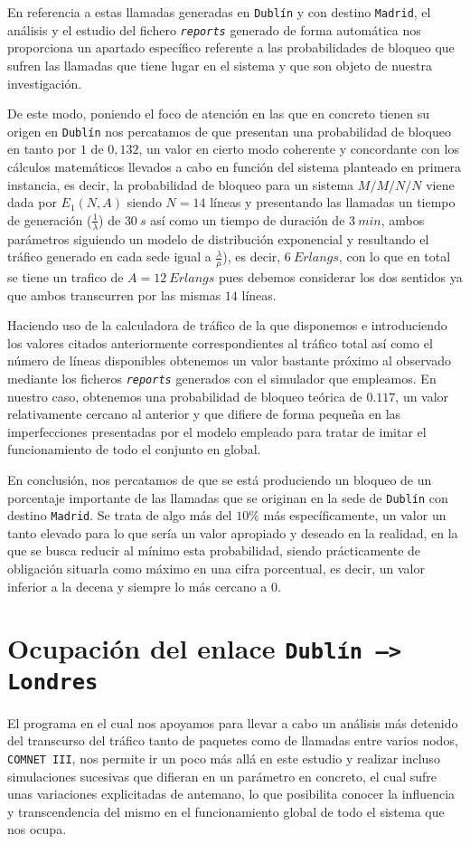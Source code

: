 \documentclass{article}[10pt]
\begin{document}
		En referencia a estas llamadas generadas en \texttt{Dublín} y con destino \texttt{Madrid}, el análisis y el estudio del fichero \texttt{\textit{reports}} generado de forma automática nos proporciona un apartado específico referente a las probabilidades de bloqueo que sufren las llamadas que tiene lugar en el sistema y que son objeto de nuestra investigación.

		De este modo, poniendo el foco de atención en las que en concreto tienen su origen en \texttt{Dublín} nos percatamos de que presentan una probabilidad de bloqueo en tanto por $1$ de $0,132$, un valor en cierto modo coherente y concordante con los cálculos matemáticos llevados a cabo en función del sistema planteado en primera instancia, es decir, la probabilidad de bloqueo para un sistema $M/M/N/N$ viene dada por $E_1(N, A)$ siendo $N = 14$ líneas y presentando las llamadas un tiempo de generación ($\frac{1}{\lambda}$) de $30\ s$ así como un tiempo de duración de $3\ min$, ambos parámetros siguiendo un modelo de distribución exponencial y resultando el tráfico generado en cada sede igual a $\frac{\lambda}{\mu}$), es decir, $6\ Erlangs$, con lo que en total se tiene un trafico de $A = 12\ Erlangs$ pues debemos considerar los dos sentidos ya que ambos transcurren por las mismas $14$ líneas.

		Haciendo uso de la calculadora de tráfico de la que disponemos e introduciendo los valores citados anteriormente correspondientes al tráfico total así como el número de líneas disponibles obtenemos un valor bastante próximo al observado mediante los ficheros \texttt{\textit{reports}} generados con el simulador que empleamos. En nuestro caso, obtenemos una probabilidad de bloqueo teórica de $0.117$, un valor relativamente cercano al anterior y que difiere de forma pequeña en las imperfecciones presentadas por el modelo empleado para tratar de imitar el funcionamiento de todo el conjunto en global.

		En conclusión, nos percatamos de que se está produciendo un bloqueo de un porcentaje importante de las llamadas que se originan en la sede de \texttt{Dublín} con destino \texttt{Madrid}. Se trata de algo más del $10\%$ más específicamente, un valor un tanto elevado para lo que sería un valor apropiado y deseado en la realidad, en la que se busca reducir al mínimo esta probabilidad, siendo prácticamente de obligación situarla como máximo en una cifra porcentual, es decir, un valor inferior a la decena y siempre lo más cercano a $0$.

	\section{Ocupación del enlace \texttt{Dublín --> Londres}}
		El programa en el cual nos apoyamos para llevar a cabo un análisis más detenido del transcurso del tráfico tanto de paquetes como de llamadas entre varios nodos, \texttt{COMNET III}, nos permite ir un poco más allá en este estudio y realizar incluso simulaciones sucesivas que difieran en un parámetro en concreto, el cual sufre unas variaciones explicitadas de antemano, lo que posibilita conocer la influencia y transcendencia del mismo en el funcionamiento global de todo el sistema que nos ocupa.
\end{document}

